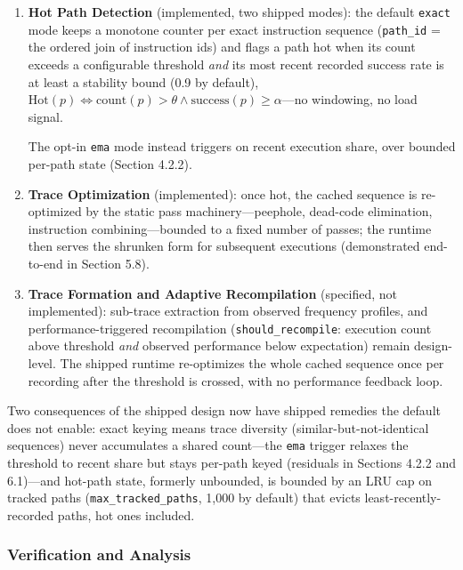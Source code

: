 \documentclass[
  sigconf,
  anonymous]{acmart}
\begin{document}
\begin{enumerate}
\def\labelenumi{\arabic{enumi}.}
\item
  \textbf{Hot Path Detection} (implemented, two shipped modes): the
  default \texttt{exact} mode keeps a monotone counter per exact
  instruction sequence (\texttt{path\_id} = the ordered join of
  instruction ids) and flags a path hot when its count exceeds a
  configurable threshold \emph{and} its most recent recorded success
  rate is at least a stability bound (0.9 by default),
  \(\text{Hot}(p) \iff \text{count}(p) > \theta \land \text{success}(p) \geq \alpha\)---no
  windowing, no load signal.

  The opt-in \texttt{ema} mode instead triggers on recent execution
  share, over bounded per-path state (Section 4.2.2).
\item
  \textbf{Trace Optimization} (implemented): once hot, the cached
  sequence is re-optimized by the static pass machinery---peephole,
  dead-code elimination, instruction combining---bounded to a fixed
  number of passes; the runtime then serves the shrunken form for
  subsequent executions (demonstrated end-to-end in Section 5.8).
\item
  \textbf{Trace Formation and Adaptive Recompilation} (specified, not
  implemented): sub-trace extraction from observed frequency profiles,
  and performance-triggered recompilation (\texttt{should\_recompile}:
  execution count above threshold \emph{and} observed performance below
  expectation) remain design-level. The shipped runtime re-optimizes the
  whole cached sequence once per recording after the threshold is
  crossed, with no performance feedback loop.
\end{enumerate}

Two consequences of the shipped design now have shipped remedies the
default does not enable: exact keying means trace diversity
(similar-but-not-identical sequences) never accumulates a shared
count---the \texttt{ema} trigger relaxes the threshold to recent share
but stays per-path keyed (residuals in Sections 4.2.2 and 6.1)---and
hot-path state, formerly unbounded, is bounded by an LRU cap on tracked
paths (\texttt{max\_tracked\_paths}, 1,000 by default) that evicts
least-recently-recorded paths, hot ones included.

\subsubsection{Verification and
Analysis}\label{verification-and-analysis}
\end{document}
